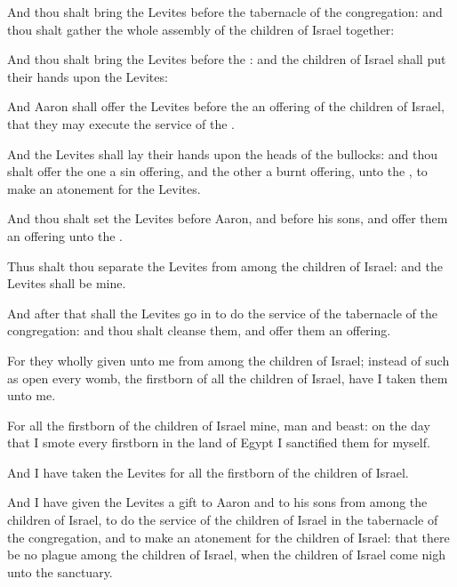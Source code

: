 {And thou shalt
bring the
Levites
before the
tabernacle of the
congregation: and thou shalt
gather the whole
assembly of the
children of
Israel
together:

And thou shalt
bring the
Levites
before the
{}: and the
children of
Israel shall
put their
hands upon the
Levites:

And
Aaron shall
offer the
Levites
before the
{}
{} an
offering of the
children of
Israel, that they may
execute the
service of the
{}.

And the
Levites shall
lay their
hands upon the
heads of the
bullocks: and thou shalt
offer the
one
{} a sin
offering, and the
other
{} a burnt
offering, unto the
{}, to make an
atonement for the
Levites.

And thou shalt
set the
Levites
before
Aaron, and
before his
sons, and
offer them
{} an
offering unto the
{}.

Thus shalt thou
separate the
Levites from
among the
children of
Israel: and the
Levites shall be mine.

And
after that shall the
Levites go
in to do the
service of the
tabernacle of the
congregation: and thou shalt
cleanse them, and
offer them
{} an
offering.

For they
{} wholly
given unto me from
among the
children of
Israel; instead of such as
open every
womb,
{} the
firstborn of all the
children of
Israel, have I
taken them unto me.

For all the
firstborn of the
children of
Israel
{} mine,
{}
man and
beast: on the
day that I
smote every
firstborn in the
land of
Egypt I
sanctified them for myself.

And I have
taken the
Levites for all the
firstborn of the
children of
Israel.

And I have
given the
Levites
{} a
gift to
Aaron and to his
sons from
among the
children of
Israel, to
do the
service of the
children of
Israel in the
tabernacle of the
congregation, and to make an
atonement for the
children of
Israel: that there be no
plague among the
children of
Israel, when the
children of
Israel come
nigh unto the
sanctuary.

}

